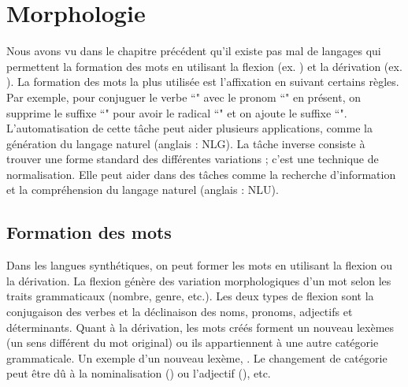 \documentclass{KodeBook}
\begin{document}
\section{Morphologie}

Nous avons vu dans le chapitre précédent qu'il existe pas mal de langages qui permettent la formation des mots en utilisant la flexion (ex. ) et la dérivation (ex. ). 
La formation des mots la plus utilisée est l'affixation en suivant certains règles. 
Par exemple, pour conjuguer le verbe ``" avec le pronom ``" en présent, on supprime le suffixe ``" pour avoir le radical ``" et on ajoute le suffixe ``". 
L'automatisation de cette tâche peut aider plusieurs applications, comme la génération du langage naturel (anglais : NLG). 
La tâche inverse consiste à trouver une forme standard des différentes variations ; c'est une technique de normalisation.
Elle peut aider dans des tâches comme la recherche d'information et la compréhension du langage naturel (anglais : NLU).

\subsection{Formation des mots}

Dans les langues synthétiques, on peut former les mots en utilisant la flexion ou la dérivation. 
La flexion génère des variation morphologiques d'un mot selon les traits grammaticaux (nombre, genre, etc.). 
Les deux types de flexion sont la conjugaison des verbes et la déclinaison des noms, pronoms, adjectifs et déterminants.
Quant à la dérivation, les mots créés forment un nouveau lexèmes (un sens différent du mot original) ou ils appartiennent à une autre catégorie grammaticale. 
Un exemple d'un nouveau lexème,  .
Le changement de catégorie peut être dû à la nominalisation () ou l'adjectif (), etc.
\end{document}
